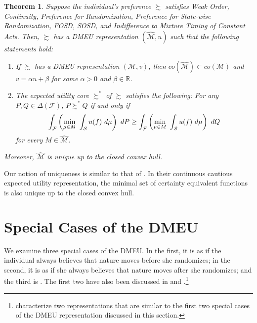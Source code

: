\documentclass[12pt, notitlepage]{article}
\newtheorem{theorem}{Theorem}
\begin{document}
\begin{theorem}
\label{uniq}Suppose the individual's preference $\succsim $ satisfies Weak
Order, Continuity, Preference for Randomization, Preference for State-wise
Randomization, FOSD, SOSD, and Indifference to Mixture Timing of Constant
Acts. Then, $\succsim $ has a DMEU representation $\left( \widehat{\mathcal{M%
}},u\right) $ such that the following statements hold:

\begin{enumerate}
\item If $\succsim $ has a DMEU representation $(\mathcal{M},v)$, then $%
\overline{co}\left( \widehat{\mathcal{M}}\right) \subset \overline{co}(%
\mathcal{M})$ and $v=\alpha u+\beta $ for some $\alpha >0$ and $\beta \in 
\mathbb{R}$.

\item The expected utility core $\succsim ^{\ast }$ of $\succsim $ satisfies
the following: For any $P,Q\in \Delta (\mathcal{F})$, $P\succsim ^{\ast }Q$
if and only if%
\begin{equation*}
\int_{\mathcal{F}}\left( \underset{\mu \in M}{\min }~\int_{\mathcal{S}%
}u(f)~d\mu \right) ~dP\geq \int_{\mathcal{F}}\left( \underset{\mu \in M}{%
\min }~\int_{\mathcal{S}}u(f)~d\mu \right) ~dQ
\end{equation*}%
for every $M\in \widehat{\mathcal{M}}$.
\end{enumerate}

Moreover, $\widehat{\mathcal{M}}$ is unique up to the closed convex hull.
\end{theorem}

Our notion of uniqueness is similar to that of \cite%
{Cerreia-VioglioDillenbergerOrtoleva15}. In their continuous cautious
expected utility representation, the minimal set of certainty equivalent
functions is also unique up to the closed convex hull.

\section{Special Cases of the DMEU}

\label{threeaxioms}We examine three special cases of the DMEU. In the first,
it is as if the individual always believes that nature moves before she
randomizes; in the second, it is as if she always believes that nature moves
after she randomizes; and the third is \cite{Saito15}. The first two have
also been discussed in \cite{Seo09} and \cite{Saito15}.\footnote{\cite%
{EpsteinMarinacciSeo07} characterize two representations that are similar to
the first two special cases of the DMEU representation discussed in this
section.}
\end{document}
